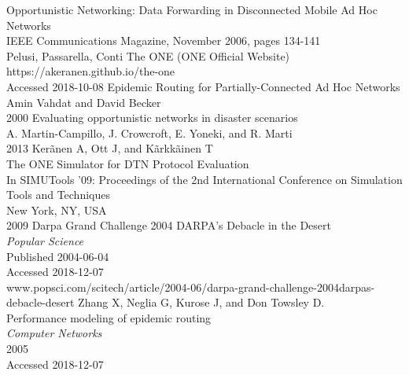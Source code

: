 \documentclass[12pt]{report}
\begin{document}
\begin{thebibliography}{0}
    Opportunistic Networking: Data Forwarding in Disconnected Mobile Ad Hoc Networks\\
    IEEE Communications Magazine, November 2006, pages 134-141\\
    Pelusi, Passarella, Conti
    The ONE (ONE Official Website)\\
    https://akeranen.github.io/the-one\\
    Accessed 2018-10-08
    Epidemic Routing for Partially-Connected Ad Hoc Networks\\
    Amin Vahdat and David Becker\\
    2000
    Evaluating opportunistic networks in disaster scenarios\\
    A. Martin-Campillo, J. Crowcroft, E. Yoneki, and R. Marti\\
    2013
    Kerãnen A, Ott J, and Kãrkkãinen T\\
    The ONE Simulator for DTN Protocol Evaluation\\
    In SIMUTools ’09: Proceedings of the 2nd International Conference on Simulation Tools and Techniques\\
    New York, NY, USA\\
    2009
    Darpa Grand Challenge 2004 DARPA's Debacle in the Desert\\
    \textit{Popular Science}\\
    Published 2004-06-04\\
    Accessed 2018-12-07\\
    www.popsci.com/scitech/article/2004-06/darpa-grand-challenge-2004darpas-debacle-desert
    Zhang X, Neglia G, Kurose J, and Don Towsley D.\\
    Performance modeling of epidemic routing\\
    \textit{Computer Networks}\\
    2005\\
    Accessed 2018-12-07
\end{thebibliography}
\end{document}
